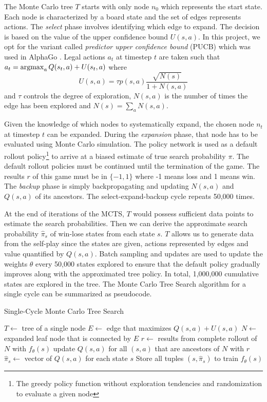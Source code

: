 \documentclass[letterpaper]{article} %
\begin{document}
The Monte Carlo tree $T$ starts with only node $n_0$ which represents the start state. Each node is characterized by a board state and the set of edges represents actions. The \textit{select} phase involves identifying which edge to expand. The decision is based on the value of the upper confidence bound $U(s,a)$. In this project, we opt for the variant called \textit{predictor upper confidence bound} (PUCB) which was used in AlphaGo \cite{rosin2011multi}. Legal actions $a_t$ at timestep $t$ are taken such that $a_t = \operatorname*{argmax}_a Q(s_t,a) + U(s_t, a)$ where
$$U(s,a) = \tau p(s,a) \frac{\sqrt{N(s)}}{1 + N(s,a)}$$
and $\tau$ controls the degree of exploration, $N(s,a)$ is the number of times the edge has been explored and $N(s) = \sum_{a} N(s,a)$.

Given the knowledge of which nodes to systematically expand, the chosen node $n_t$ at timestep $t$ can be expanded. During the \textit{expansion} phase, that node has to be evaluated using Monte Carlo simulation. The policy network is used as a default rollout policy\footnote{The greedy policy function without exploration tendencies and randomization to evaluate a given node} to arrive at a biased estimate of true search probability $\pi$. The default rollout policies must be continued until the termination of the game. The results $r$ of this game must be in $\{-1, 1\}$ where -1 means loss and 1 means win. The \textit{backup} phase is simply backpropagating and updating $N(s,a)$ and $Q(s,a)$ of its ancestors. The select-expand-backup cycle repeats 50,000 times.

At the end of iterations of the MCTS, $T$ would possess sufficient data points to estimate the search probabilities. Then we can derive the approximate search probability $\hat\pi_s$ of win-lose states from each state $s$. $T$ allows us to generate data from the self-play since the states are given, actions represented by edges and value quantified by $Q(s,a)$. Batch sampling and updates are used to update the weights $\theta$ every 50,000 states explored to ensure that the default policy gradually improves along with the approximated tree policy. In total, 1,000,000 cumulative states are explored in the tree. The Monte Carlo Tree Search algorithm for a single cycle can be summarized as pseudocode.
\begin{algorithm}[H]
	\caption{Single-Cycle Monte Carlo Tree Search}
	\begin{algorithmic}[1]
		\State $T \gets$ tree of a single node
		    \State $E \gets$ edge that maximizes $Q(s,a) + U(s,a)$
		    \State $N \gets$ expanded leaf node that is connected by $E$
		    \State $r \gets$ results from complete rollout of $N$ with $f_\theta(s)$
		    \State update $Q(s,a)$ for all $(s,a)$ that are ancestors of $N$ with $r$
		\EndWhile
		\State $\hat\pi_s \gets$ vector of $Q(s,a)$ for each state $s$
		\State Store all tuples $(s, \hat\pi_s)$ to train $f_\theta(s)$
	\end{algorithmic}
\end{algorithm}
\end{document}
